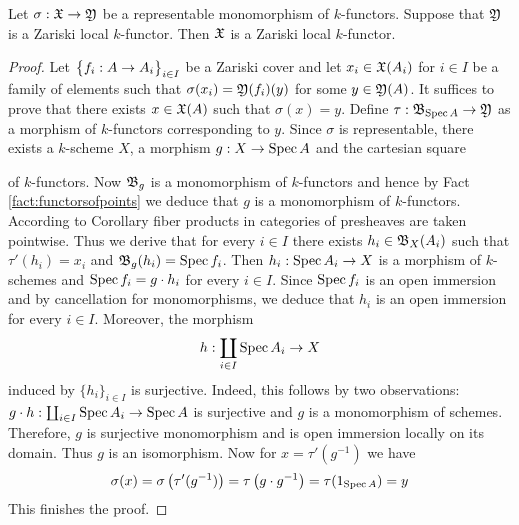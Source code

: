 \begin{proposition}\label{proposition:representablemonomorphismsaresheaves}
Let $\sigma:{\mathfrak X} \rightarrow {\mathfrak Y}$ be a representable monomorphism of $k$-functors. Suppose that ${\mathfrak Y}$ is a Zariski local $k$-functor. Then ${\mathfrak X}$ is a Zariski local $k$-functor.
\end{proposition}
\begin{proof}
Let $\big\{f_i:A\rightarrow A_i\big\}_{i\in I}$ be a Zariski cover and let $x_i\in {\mathfrak X}(A_i)$ for $i\in I$ be a family of elements such that $\sigma(x_i) = {\mathfrak Y}(f_i)(y)$ for some $y\in {\mathfrak Y}(A)$. It suffices to prove that there exists $x\in {\mathfrak X}(A)$ such that $\sigma(x)=y$. Define $\tau:{\mathfrak B}_{\mathrm{Spec}\, A}\rightarrow {\mathfrak Y}$ as a morphism of $k$-functors corresponding to $y$. Since $\sigma$ is representable, there exists a $k$-scheme $X$, a morphism $g:X\rightarrow \mathrm{Spec}\, A$ and the cartesian square
\begin{center}
\end{center}
of $k$-functors. Now ${\mathfrak B}_g$ is a monomorphism of $k$-functors and hence by Fact \ref{fact:functorsofpoints} we deduce that $g$ is a monomorphism of $k$-functors. According to Corollary {\cite[Corollary 3.5]{Presheaves}} fiber products in categories of presheaves are taken pointwise. Thus we derive that for every $i\in I$ there exists $h_i\in {\mathfrak B}_X(A_i)$ such that $\tau'(h_i) = x_i$ and ${\mathfrak B}_g(h_i) = \mathrm{Spec}\, f_i$. Then $h_i:\mathrm{Spec}\, A_i\rightarrow X$ is a morphism of $k$-schemes and $\mathrm{Spec}\, f_i = g\cdot h_i$ for every $i\in I$. Since $\mathrm{Spec}\, f_i$ is an open immersion and by cancellation for monomorphisms, we deduce that $h_i$ is an open immersion for every $i\in I$. Moreover, the morphism
$$h:\coprod_{i\in I}\mathrm{Spec}\, A_i\rightarrow X$$
induced by $\{h_i\}_{i\in I}$ is surjective. Indeed, this follows by two observations: $g\cdot h:\coprod_{i\in I}\mathrm{Spec}\, A_i\rightarrow \mathrm{Spec}\, A$ is surjective and $g$ is a monomorphism of schemes. Therefore, $g$ is surjective monomorphism and is open immersion locally on its domain. Thus $g$ is an isomorphism. Now for $x = \tau'(g^{-1})$ we have
$$\sigma(x) = \sigma\left(\tau'(g^{-1})\right) = \tau\left(g\cdot g^{-1}\right) = \tau(1_{\mathrm{Spec}\, A}) = y$$
This finishes the proof.
\end{proof}

